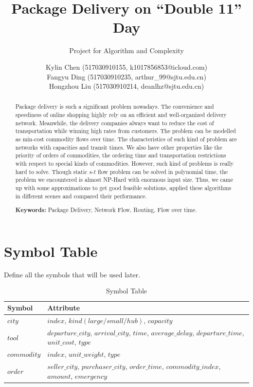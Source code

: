 \documentclass{llncs}
\title{Package Delivery on ``Double 11'' Day}
\subtitle{Project for Algorithm and Complexity \vspace{-3mm}}
\author{
Kylin Chen (517030910155, k1017856853@icloud.com) \\
Fangyu Ding (517030910235, arthur\_99@sjtu.edu.cn) \\
Hongzhou Liu (517030910214, deanlhz@sjtu.edu.cn)
  }
\institute{Department of Computer Science, \\ Shanghai Jiao Tong University, Shanghai, China}
\begin{document}



\maketitle
\begin{abstract}\vspace{-5mm}
Package delivery is such a significant problem nowadays. The convenience and speediness of online shopping highly rely on an efficient and well-organized delivery network.
Meanwhile, the delivery companies always want to reduce the cost of transportation while winning high rates from customers. The problem can be modelled as min-cost commodity flows over time.
The characteristics of such kind of problem are networks with capacities and transit times. We also have other properties like the priority of orders of commodities, the ordering time and transportation restrictions 
with respect to special kinds of commodities. However, such kind of problems is really hard to solve. Though static $s$-$t$ flow problem can be solved in polynomial time, the problem we encountered is almost NP-Hard with enormous input size.
Thus, we came up with some approximations to get good feasible solutions, applied these algorithms in different scenes and compared their performance.

\textbf{Keywords:} Package Delivery, Network Flow, Routing, Flow over time.
\end{abstract}

\setcounter{section}{-1}
\section{Symbol Table}
Define all the symbols that will be used later.
\begin{table}
\caption{Symbol Table}\label{sym1}
\centering
\begin{tabular}{|l|l|}
\hline
Symbol &  Attribute \\
\hline
$city$ & $index$, $kind(large/small/hub)$, $capacity$\\
\hline
$tool$ & $departure\_city$, $arrival\_city$, $time$, $average\_delay$, $departure\_time$, $unit\_cost$, $type$ \\
\hline
$commodity$ & $index$, $unit\_weight$, $type$ \\
\hline
$order$ & $seller\_city$, $purchaser\_city$, $order\_time$, $commodity\_index$, $amount$, $emergency$ \\
\hline
\end{tabular}
\end{table}
\newpage
\end{document}
